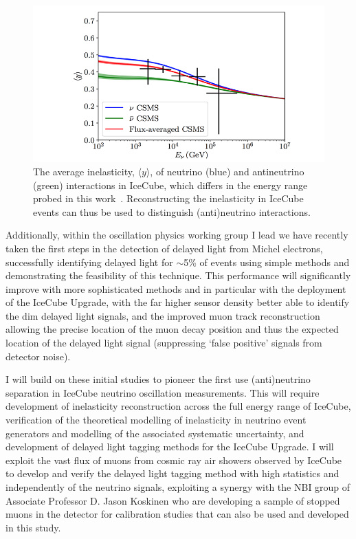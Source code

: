 \documentclass[a4paper,11pt]{article}
\begin{document}
\begin{figure} %
    \centering
    \includegraphics[trim=2.0cm 0.0cm 1.0cm 0.0cm, clip=true, width=\linewidth]{images/inelasticity.png}
    \caption{The average inelasticity, $\langle y \rangle$, of neutrino (blue) and antineutrino (green) interactions in IceCube, which differs in the energy range probed in this work~\cite{Aartsen:2018vez}. Reconstructing the inelasticity in IceCube events can thus be used to distinguish (anti)neutrino interactions.}
    \label{fig:inelasticity}
\end{figure}

Additionally, within the oscillation physics working group I lead we have recently taken the first steps in the detection of delayed light from Michel electrons, successfully identifying delayed light for $\sim$5\% of events using simple methods and demonstrating the feasibility of this technique. This performance will significantly improve with more sophisticated methods and in particular with the deployment of the IceCube Upgrade, with the far higher sensor density better able to identify the dim delayed light signals, and the improved muon track reconstruction allowing the precise location of the muon decay position and thus the expected location of the delayed light signal (suppressing `false positive' signals from detector noise). 


I will build on these initial studies to pioneer the first use (anti)neutrino separation in IceCube neutrino oscillation measurements. This will require development of inelasticity reconstruction across the full energy range of IceCube, verification of the theoretical modelling of inelasticity in neutrino event generators and modelling of the associated systematic uncertainty, and development of delayed light tagging methods for the IceCube Upgrade. I will exploit the vast flux of muons from cosmic ray air showers observed by IceCube to develop and verify the delayed light tagging method with high statistics and independently of the neutrino signals, exploiting a synergy with the NBI group of Associate Professor D. Jason Koskinen who are developing a sample of stopped muons in the detector for calibration studies that can also be used and developed in this study. 
\end{document}
